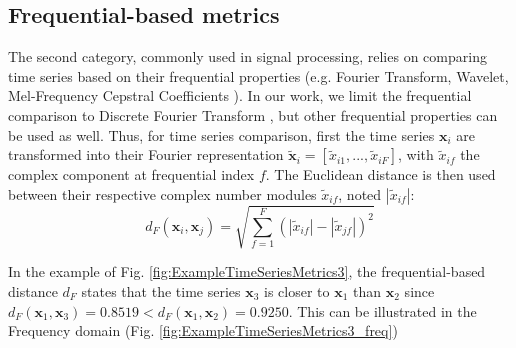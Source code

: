 \subsection{Frequential-based metrics}
The second category, commonly used in signal processing, relies on comparing time series based on their frequential properties (e.g. Fourier Transform, Wavelet, Mel-Frequency Cepstral Coefficients \cite{Sahidullah2012,Torrence1998,Brigham1967}). In our work, we limit the frequential comparison to Discrete Fourier Transform \cite{Lhermitte2011a}, but other frequential properties can be used as well. Thus, for time series comparison, first the time series $\textbf{x}_i$ are transformed into their Fourier representation $\tilde{\textbf{x}}_i=[\tilde{x}_{i1}, ...,  \tilde{x}_{iF}]$, with $\tilde{x}_{if}$ the complex component at frequential index $f$. The Euclidean distance is then used  between their respective complex number modules $\tilde{x}_{if}$, noted $|\tilde{x}_{if}|$:
\begin{equation}
d_{F}(\textbf{x}_i,\textbf{x}_j) = \sqrt{\sum_{f=1}^{F} 
	(|\tilde{x}_{if}|-|\tilde{x}_{jf}|)^2}
\label{eq:F}
\end{equation}

In the example of Fig. \ref{fig:ExampleTimeSeriesMetrics3}, the frequential-based distance $d_F$ states that the time series $\textbf{x}_3$ is closer to $\textbf{x}_1$ than $\textbf{x}_2$ since $d_F(\textbf{x}_1,\textbf{x}_3) = 0.8519 < d_F(\textbf{x}_1,\textbf{x}_2) = 0.9250$. This can be illustrated in the Frequency domain (Fig. \ref{fig:ExampleTimeSeriesMetrics3_freq})



